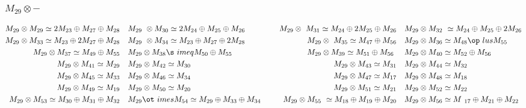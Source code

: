 \subsubsection{$M_29\otimes -$}
\begin{align*}
M_{29} \otimes M_{29} \simeq 2 M_{23} \oplus M_{27} \oplus M_{28} &&& M_{29} \
\otimes M_{30} \simeq 2 M_{24} \oplus M_{25} \oplus M_{26} &&& M_{29} \otimes \
M_{31} \simeq M_{24} \oplus 2 M_{25} \oplus M_{26} &&& M_{29} \otimes M_{32} \
\simeq M_{24} \oplus M_{25} \oplus 2 M_{26}\\
M_{29} \otimes M_{33} \simeq M_{23} \oplus 2 M_{27} \oplus M_{28} &&& M_{29} \
\otimes M_{34} \simeq M_{23} \oplus M_{27} \oplus 2 M_{28} &&& M_{29} \otimes \
M_{35} \simeq M_{47} \oplus M_{56} &&& M_{29} \otimes M_{36} \simeq M_{48} \op\
lus M_{55}\\
M_{29} \otimes M_{37} \simeq M_{49} \oplus M_{55} &&& M_{29} \otimes M_{38} \s\
imeq M_{50} \oplus M_{55} &&& M_{29} \otimes M_{39} \simeq M_{51} \oplus M_{56\
} &&& M_{29} \otimes M_{40} \simeq M_{52} \oplus M_{56}\\
M_{29} \otimes M_{41} \simeq M_{29} &&& M_{29} \otimes M_{42} \simeq M_{30} &&\
& M_{29} \otimes M_{43} \simeq M_{31} &&& M_{29} \otimes M_{44} \simeq M_{32}\
\\
M_{29} \otimes M_{45} \simeq M_{33} &&& M_{29} \otimes M_{46} \simeq M_{34} &&\
& M_{29} \otimes M_{47} \simeq M_{17} &&& M_{29} \otimes M_{48} \simeq M_{18}\
\\
M_{29} \otimes M_{49} \simeq M_{19} &&& M_{29} \otimes M_{50} \simeq M_{20} &&\
& M_{29} \otimes M_{51} \simeq M_{21} &&& M_{29} \otimes M_{52} \simeq M_{22}\
\\
M_{29} \otimes M_{53} \simeq M_{30} \oplus M_{31} \oplus M_{32} &&& M_{29} \ot\
imes M_{54} \simeq M_{29} \oplus M_{33} \oplus M_{34} &&& M_{29} \otimes M_{55\
} \simeq M_{18} \oplus M_{19} \oplus M_{20} &&& M_{29} \otimes M_{56} \simeq M\
_{17} \oplus M_{21} \oplus M_{22}\\
\end{align*}

